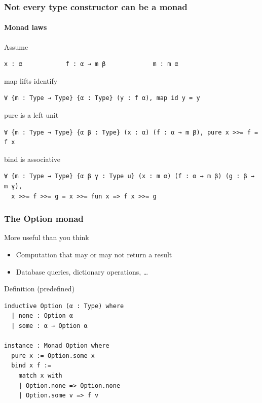 \documentclass{beamer}
\begin{document}
\begin{frame}[fragile]
  \frametitle{Not every type constructor can be a monad}
  \framesubtitle{Monad laws}
  \begin{block}{Assume}
\begin{lstlisting}
x : α            f : α → m β             m : m α
\end{lstlisting}
  \end{block}
  \begin{alertblock}{map lifts identify}
\begin{lstlisting}
∀ {m : Type → Type} {α : Type} (y : f α), map id y = y
\end{lstlisting}
  \end{alertblock}
  \begin{alertblock}{pure is a left unit}
\begin{lstlisting}
∀ {m : Type → Type} {α β : Type} (x : α) (f : α → m β), pure x >>= f = f x
\end{lstlisting}
  \end{alertblock}
  \begin{alertblock}{bind is associative}
\begin{lstlisting}
∀ {m : Type → Type} {α β γ : Type u} (x : m α) (f : α → m β) (g : β → m γ),
  x >>= f >>= g = x >>= fun x => f x >>= g
\end{lstlisting}
  \end{alertblock}
\end{frame}

\begin{frame}[fragile]
  \frametitle{The Option monad}
  \begin{block}{More useful than you think}
                \begin{itemize}         
                        \item Computation that may or may not return a result
                        \item Database queries, dictionary operations, \dots
                \end{itemize}   
                \end{block}     
\pause
\begin{block}{Definition (predefined)}
\begin{lstlisting}
inductive Option (α : Type) where
  | none : Option α
  | some : α → Option α

instance : Monad Option where
  pure x := Option.some x
  bind x f :=
    match x with
    | Option.none => Option.none
    | Option.some v => f v
\end{lstlisting}  
\end{block}
\end{frame}             
\end{document}
